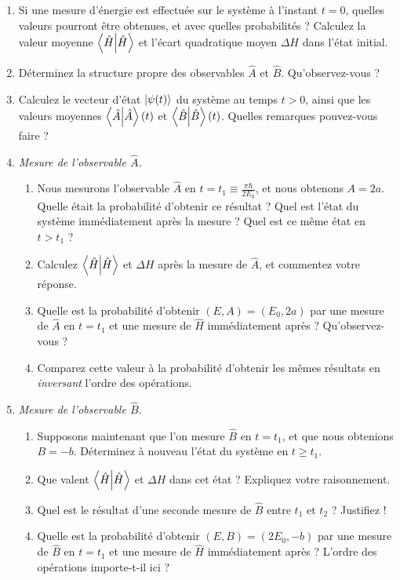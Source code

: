 \begin{enumerate}
\item Si une mesure d'énergie est effectuée sur le système à l'instant $t=0$, quelles valeurs pourront être obtenues, et avec quelles probabilités ? Calculez la valeur moyenne $\braket{\hat H}$ et l'écart quadratique moyen $\Delta H$ dans l'état initial.
\item Déterminez la structure propre des observables $\hat A$ et $\hat B$. Qu'observez-vous ?
\item Calculez le vecteur d'état $\ket{\psi(t)}$ du système au temps $t>0$, ainsi que les valeurs moyennes $\braket{\hat A}(t)$ et $\braket{\hat B}(t)$. Quelles remarques pouvez-vous faire ?
\item \textit{Mesure de l'observable $\hat A$.}
\begin{enumerate}
\item Nous mesurons l'observable $\hat A$ en $t=t_1\equiv \frac{\pi\hbar}{2E_0}$, et nous obtenons $A=2a$. Quelle était la probabilité d'obtenir ce résultat ? Quel est l'état du système immédiatement après la mesure ? Quel est ce même état en $t>t_1$ ? 
\item Calculez $\braket{\hat H}$ et $\Delta H$ après la mesure de $\hat A$, et commentez votre réponse.
\item Quelle est la probabilité d'obtenir $(E,A) = (E_0,2a)$ par une mesure de $\hat A$ en $t=t_1$ et une mesure de $\hat H$ immédiatement après ? Qu'observez-vous ?
\item Comparez cette valeur à la probabilité d'obtenir les mêmes résultats en \textit{inversant} l'ordre des opérations.
\end{enumerate}
\item \textit{Mesure de l'observable $\hat B$.}
\begin{enumerate}
\item Supposons maintenant que l'on mesure $\hat B$ en $t=t_1$, et que nous obtenions $B=-b$. Déterminez à nouveau l'état du système en $t\geq t_1$. 
\item Que valent $\braket{\hat H}$ et $\Delta H$ dans cet état ? Expliquez votre raisonnement.
\item Quel est le résultat d'une seconde mesure de $\hat B$ entre $t_1$ et $t_2$ ? Justifiez !
\item Quelle est la probabilité d'obtenir $(E,B) = (2E_0,-b)$ par une mesure de $\hat B$ en $t=t_1$ et une mesure de $\hat H$ immédiatement après ? L'ordre des opérations importe-t-il ici ? 
\end{enumerate}
\end{enumerate}



